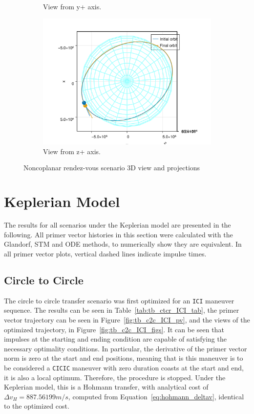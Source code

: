\begin{figure}[htbp]
\begin{subfigure}{0.49\linewidth}
        \caption{View from y+ axis.}
    \end{subfigure}
    \begin{subfigure}{0.49\linewidth}
        \includegraphics[width=0.8\linewidth]{../results/two_body/ipv_noncop/scenario_z+.png}
        \caption{View from z+ axis.}
    \end{subfigure}
    \caption{Noncoplanar rendez-vous scenario 3D view and projections}
    \label{fig:noncop_rdv_scenario}
\end{figure}

\FloatBarrier
\section{Keplerian Model}

The results for all scenarios under the Keplerian model are presented in the following. All primer vector histories in this section were calculated with the Glandorf, STM and ODE methods, to numerically show they are equivalent. In all primer vector plots, vertical dashed lines indicate impulse times.

\subsection{Circle to Circle}

The circle to circle transfer scenario was first optimized for an \texttt{ICI} maneuver sequence. The results can be seen in Table~\ref{tab:tb_ctcr_ICI_tab}, the primer vector trajectory can be seen in Figure~\ref{fig:tb_c2c_ICI_pv}, and the views of the optimized trajectory, in Figure~\ref{fig:tb_c2c_ICI_figs}. It can be seen that impulses at the starting and ending condition are capable of satisfying the necessary optimality conditions. In particular, the derivative of the primer vector norm is zero at the start and end positions, meaning that is this maneuver is to be considered a \texttt{CICIC} maneuver with zero duration coasts at the start and end, it is also a local optimum. Therefore, the procedure is stopped. Under the Keplerian model, this is a Hohmann transfer, with analytical cost of \(\Delta v_H = 887.56199 m/s\), computed from Equation~\eqref{eq:hohmann_deltav}, identical to the optimized cost.

